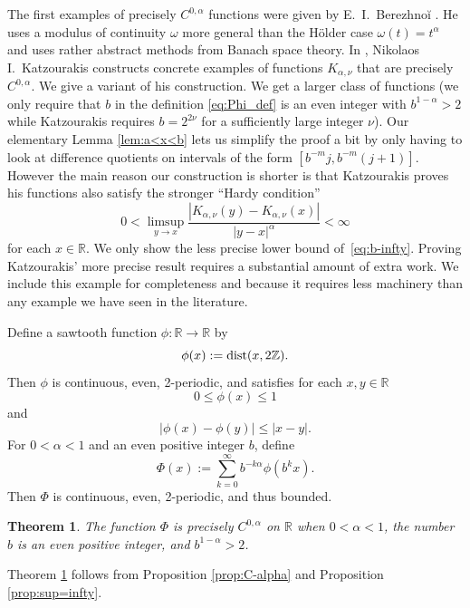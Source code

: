 \documentclass[12pt]{amsart}
\newcommand{\adj}{{precisely }} %
\numberwithin{equation}{section}
\newcommand{\R}{{\mathbb R}}		%
\newcommand{\cn}{\colon}                %
\newcommand{\dist}{\mathop{\rm dist}}
\newcommand{\Z}{{\mathbb Z}}
\newtheorem{thm}{Theorem}[section]
\theoremstyle{definition}
\theoremstyle{remark}
\begin{document}
The first examples of  \adj $C^{0,\alpha} $ functions were
given by E.\ I.\ Berezhno\u{i} \cite{Berez:nonsmooth}. 
He uses a modulus of continuity $\omega$ more general than
the H\"older case $\omega(t) = t^\alpha$ and  uses rather
abstract methods from Banach space theory.
In  \cite{Kat:Holder},   
Nikolaos I.\  Katzourakis constructs  concrete  examples
of functions $K_{\alpha, \nu}$ that are \adj $C^{0,\alpha}$. 
We give a variant of his construction.
We get a larger class of functions
(we only require that $b$ in the definition \eqref{eq:Phi_def}
is an even integer with $b^{1-\alpha}>2$ while 
Katzourakis requires  $b=2^{2\nu}$ 
for  a sufficiently large integer $\nu$). 
Our elementary Lemma \ref{lem:a<x<b} 
lets us simplify the proof a bit
by only having to look at difference quotients on intervals of
the form $[b^{-m}j,b^{-m}(j+1)]$.
However the main reason our construction  
is shorter is that  Katzourakis proves his functions also
satisfy the stronger   ``Hardy condition''
\begin{equation*}
0< \limsup_{y\to x} \frac{|K_{\alpha,\nu}(y)- K_{\alpha,\nu}(x)|}{|y-x|^\alpha}
 < \infty
\end{equation*}
for each $x\in \R$.
We only show the less precise lower bound of~\eqref{eq:b-infty}.
 Proving Katzourakis' more precise result 
requires a substantial amount of extra work.  We include this example 
for completeness and because it  requires less machinery 
than any example we have seen in the literature. 


Define a sawtooth function  $\phi\cn \R \to \R$ by
$$
\phi(x) := \dist(x, 2\Z).
$$
Then $\phi$ is continuous,   even, 2-periodic, and  satisfies
for each $x,y\in\R$
$$
0\le \phi(x) \le 1
$$
and
\begin{equation}\label{eq:phi_lip}
|\phi(x)-\phi(y)|\le |x-y|.
\end{equation}
For $0<\alpha < 1$
and an   even positive integer $b$,
define 
\begin{equation}\label{eq:Phi_def}
\Phi(x) := \sum_{k=0}^\infty b^{-k\alpha}\phi(b^k x).
\end{equation}
Then $\Phi$ is continuous,  even, 2-periodic, and thus bounded.

\begin{thm}\label{thm:Kat}
  The function $\Phi$ is \adj $C^{0,\alpha}$ on $\R$
  when  $0<\alpha<1$, the number $b$ is an even positive integer,
  and  $b^{1-\alpha}>2$. 
\end{thm}



Theorem \ref{thm:Kat}  follows from
Proposition \ref{prop:C-alpha} and Proposition \ref{prop:sup=infty}.
\end{document}
